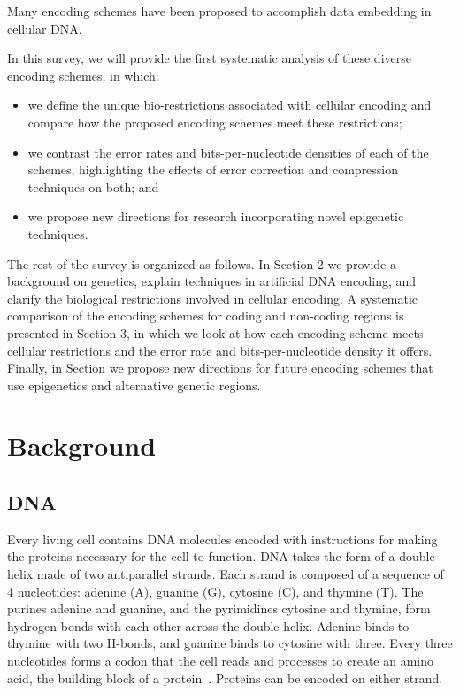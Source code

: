 \documentclass[USenglish,oneside,twocolumn]{article}
\begin{document}
Many encoding schemes have been proposed to accomplish data embedding in cellular DNA.

In this survey, we will provide the first systematic analysis of these diverse encoding schemes, in which:
\\
\begin{itemize}
\item we define the unique bio-restrictions associated with cellular encoding and compare how the proposed encoding schemes meet these restrictions;
\item we contrast the error rates and bits-per-nucleotide densities of each of the schemes, highlighting the effects of error correction and compression techniques on both; and
\item we propose new directions for research incorporating novel epigenetic techniques.
\end{itemize}

The rest of the survey is organized as follows. In Section 2 we provide a background on genetics, explain techniques in artificial DNA encoding, and clarify the biological restrictions involved in cellular encoding. A systematic comparison of the encoding schemes for coding and non-coding regions is presented in Section 3, in which we look at how each encoding scheme meets cellular restrictions and the error rate and bits-per-nucleotide density it offers. Finally, in Section we propose new directions for future encoding schemes that use epigenetics and alternative genetic regions.


\section{Background}

\subsection{DNA}

Every living cell contains DNA molecules encoded with instructions for making the proteins necessary for the cell to function. DNA takes the form of a double helix made of two antiparallel strands. Each strand is composed of a sequence of 4 nucleotides: adenine (A), guanine (G), cytosine (C), and thymine (T). The purines adenine and guanine, and the pyrimidines cytosine and thymine, form hydrogen bonds with each other across the double helix. Adenine binds to thymine with two H-bonds, and guanine binds to cytosine with three. Every three nucleotides forms a codon that the cell reads and processes to create an amino acid, the building block of a protein~\cite{WC1953N}. Proteins can be encoded on either strand.
\end{document}
